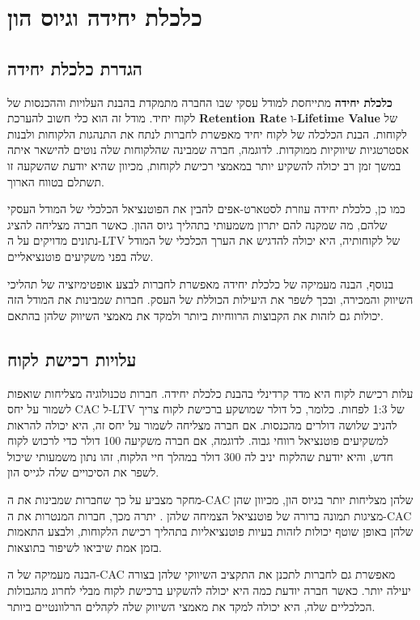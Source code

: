\chapter{כלכלת יחידה וגיוס הון}

\section{הגדרת כלכלת יחידה}
\textbf{כלכלת יחידה} מתייחסת למודל עסקי שבו החברה מתמקדת בהבנת העלויות וההכנסות של לקוח יחיד. מודל זה הוא כלי חשוב להערכת \textbf{Retention Rate} ו-\textbf{Lifetime Value } של לקוחות. הבנת הכלכלה של לקוח יחיד מאפשרת לחברות לנתח את התנהגות הלקוחות ולבנות אסטרטגיות שיווקיות ממוקדות. לדוגמה, חברה שמבינה שהלקוחות שלה נוטים להישאר איתה במשך זמן רב יכולה להשקיע יותר במאמצי רכישת לקוחות, מכיוון שהיא יודעת שהשקעה זו תשתלם בטווח הארוך.

כמו כן, כלכלת יחידה עוזרת לסטארט-אפים להבין את הפוטנציאל הכלכלי של המודל העסקי שלהם, מה שמקנה להם יתרון משמעותי בתהליך גיוס ההון. כאשר חברה מצליחה להציג נתונים מדויקים על ה-LTV של לקוחותיה, היא יכולה להדגיש את הערך הכלכלי של המודל שלה בפני משקיעים פוטנציאליים.

בנוסף, הבנה מעמיקה של כלכלת יחידה מאפשרת לחברות לבצע אופטימיזציה של תהליכי השיווק והמכירה, ובכך לשפר את היעילות הכוללת של העסק. חברות שמבינות את המודל הזה יכולות גם לזהות את הקבוצות הרווחיות ביותר ולמקד את מאמצי השיווק שלהן בהתאם.

\section{עלויות רכישת לקוח \texorpdfstring{}{(CAC)}}
עלות רכישת לקוח  היא מדד קרדינלי בהבנת כלכלת יחידה. חברות טכנולוגיה מצליחות שואפות לשמור על יחס CAC ל-LTV של 1:3 לפחות. כלומר, כל דולר שמושקע ברכישת לקוח צריך להניב שלושה דולרים מהכנסות. אם חברה מצליחה לשמור על יחס זה, היא יכולה להראות למשקיעים פוטנציאל רווחי גבוה. לדוגמה, אם חברה משקיעה 100 דולר כדי לרכוש לקוח חדש, והיא יודעת שהלקוח יניב לה 300 דולר במהלך חיי הלקוח, זהו נתון משמעותי שיכול לשפר את הסיכויים שלה לגייס הון.

מחקר מצביע על כך שחברות שמבינות את ה-CAC שלהן מצליחות יותר בגיוס הון, מכיוון שהן מציגות תמונה ברורה של פוטנציאל הצמיחה שלהן \cite{blake2020startup}. יתרה מכך, חברות המנטרות את ה-CAC שלהן באופן שוטף יכולות לזהות בעיות פוטנציאליות בתהליך רכישת הלקוחות, ולבצע התאמות בזמן אמת שיביאו לשיפור בתוצאות.

הבנה מעמיקה של ה-CAC מאפשרת גם לחברות לתכנן את התקציב השיווקי שלהן בצורה יעילה יותר. כאשר חברה יודעת כמה היא יכולה להשקיע ברכישת לקוח מבלי לחרוג מהגבולות הכלכליים שלה, היא יכולה למקד את מאמצי השיווק שלה לקהלים הרלוונטיים ביותר.

